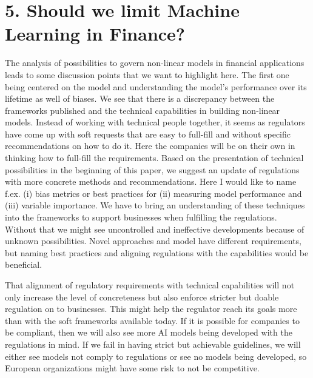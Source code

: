 \documentclass[jou,apacite]{apa6}
\begin{document}
\section{5. Should we limit Machine Learning in Finance?}

The analysis of possibilities to govern non-linear models in financial applications leads to some discussion points that we want to highlight here. The first one being centered on the model and understanding the model’s performance over its lifetime as well of biases. We see that there is a discrepancy between the frameworks published and the technical capabilities in building non-linear models. Instead of working with technical people together, it seems as regulators have come up with soft requests that are easy to full-fill and without specific recommendations on how to do it. Here the companies will be on their own in thinking how to full-fill the requirements. Based on the presentation of technical possibilities in the beginning of this paper, we suggest an update of regulations with more concrete methods and recommendations. Here I would like to name f.ex. (i) bias metrics or best practices for (ii) measuring model performance and (iii) variable importance. We have to bring an understanding of these techniques into the frameworks to support businesses when fulfilling the regulations. Without that we might see uncontrolled and ineffective developments because of unknown possibilities. Novel approaches and model have different requirements, but naming best practices and aligning regulations with the capabilities would be beneficial.\par

That alignment of regulatory requirements with technical capabilities will not only increase the level of concreteness but also enforce stricter but doable regulation on to businesses. This might help the regulator reach its goals more than with the soft frameworks available today. If it is possible for companies to be compliant, then we will also see more AI models being developed with the regulations in mind. If we fail in having strict but achievable guidelines, we will either see models not comply to regulations or see no models being developed, so European organizations might have some risk to not be competitive.\par
\end{document}
